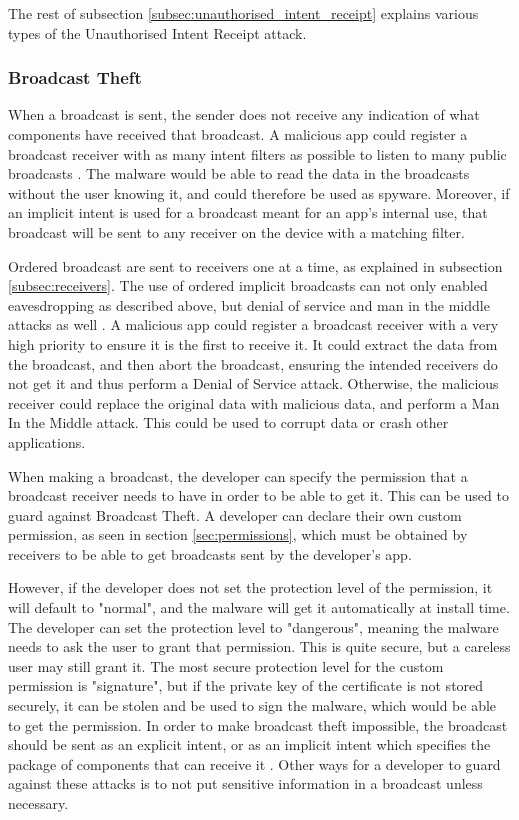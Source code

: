    The rest of subsection \ref{subsec:unauthorised_intent_receipt} explains various types of the Unauthorised Intent Receipt attack.
    
    \subsubsection{Broadcast Theft}
        \label{subsubsec:broadcast_theft}
    
    When a broadcast is sent, the sender does not receive any indication of what components have received that broadcast. A malicious app could register a broadcast receiver with as many intent filters as possible to listen to many public broadcasts \cite{2010_icc_paper}. The malware would be able to read the data in the broadcasts without the user knowing it, and could therefore be used as spyware. Moreover, if an implicit intent is used for a broadcast meant for an app’s internal use, that broadcast will be sent to any receiver on the device with a matching filter.
    
    Ordered broadcast are sent to receivers one at a time, as explained in subsection \ref{subsec:receivers}. The use of ordered implicit broadcasts can not only enabled eavesdropping as described above, but denial of service and man in the middle attacks as well \cite{2010_icc_paper}. A malicious app could register a broadcast receiver with a very high priority to ensure it is the first to receive it. It could extract the data from the broadcast, and then abort the broadcast, ensuring the intended receivers do not get it and thus perform a Denial of Service attack. Otherwise, the malicious receiver could replace the original data with malicious data, and perform a Man In the Middle attack. This could be used to corrupt data or crash other applications.
    
    When making a broadcast, the developer can specify the permission that a broadcast receiver needs to have in order to be able to get it. This can be used to guard against Broadcast Theft. A developer can declare their own custom permission, as seen in section \ref{sec:permissions}, which must be obtained by receivers to be able to get broadcasts sent by the developer's app. 
    
    However, if the developer does not set the protection level of the permission, it will default to "normal", and the malware will get it automatically at install time. The developer can set the protection level to "dangerous", meaning the malware needs to ask the user to grant that permission. This is quite secure, but a careless user may still grant it. The most secure protection level for the custom permission is "signature", but if the private key of the certificate is not stored securely, it can be stolen and be used to sign the malware, which would be able to get the permission. In order to make broadcast theft impossible, the broadcast should be sent as an explicit intent, or as an implicit intent which specifies the package of components that can receive it \cite{2010_icc_paper}. Other ways for a developer to guard against these attacks is to not put sensitive information in a broadcast unless necessary.
    
